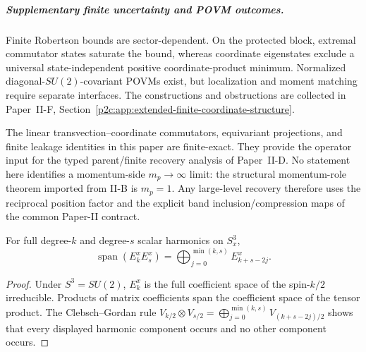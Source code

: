 \documentclass[12pt,a4paper]{article}
\begin{document}
\subparagraph{Supplementary finite uncertainty and POVM outcomes.}
Finite Robertson bounds are sector-dependent.  On the protected block,
extremal commutator states saturate the bound, whereas coordinate eigenstates
exclude a universal state-independent positive coordinate-product minimum.
Normalized diagonal-\(SU(2)\)-covariant POVMs exist, but localization and
moment matching require separate interfaces.  The constructions and
obstructions are collected in
Paper~II-F, Section~\ref{p2c:app:extended-finite-coordinate-structure}.

\begin{remark}
\label{p2c:rem:finite-exact-recovery-export}
The linear transvection--coordinate commutators, equivariant projections, and
finite leakage identities in this paper are finite-exact.  They provide the
operator input for the typed parent/finite recovery analysis of Paper~II-D.
No statement here identifies a momentum-side \(m_p\to\infty\) limit: the
structural momentum-role theorem imported from II-B is \(m_p=1\).  Any large-level
recovery therefore uses the reciprocal position factor and the explicit band
inclusion/compression maps of the common Paper-II contract.
\end{remark}


\begin{lemma}
\label{p2c:lem:v270-homogeneous-product-span}
For full degree-$k$ and degree-$s$ scalar harmonics on $S^3_x$,
\[
\boxed{\operatorname{span}(E_k^xE_s^x)
 =\bigoplus_{j=0}^{\min(k,s)} E_{k+s-2j}^x.}
\]
\end{lemma}
\begin{proof}
Under $S^3=SU(2)$, $E_k^x$ is the full coefficient space of the
spin-$k/2$ irreducible. Products of matrix coefficients span the
coefficient space of the tensor product. The Clebsch--Gordan rule
$V_{k/2}\otimes V_{s/2}=\bigoplus_{j=0}^{\min(k,s)}V_{(k+s-2j)/2}$
shows that every displayed harmonic component occurs and no other
component occurs.
\end{proof}
\end{document}
